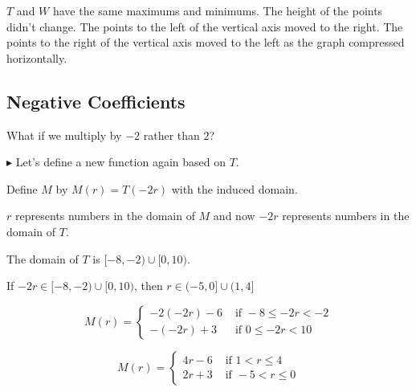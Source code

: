 \documentclass{ximera}
\begin{document}
$T$ and $W$ have the same maximums and minimums.  The height of the points didn't change.  The points to the left of the vertical axis moved to the right. The points to the right of the vertical axis moved to the left as the graph compressed horizontally.




















\subsection*{Negative Coefficients}


What if we multiply by $-2$ rather than $2$?













\textbf{\textcolor{blue!55!black}{$\blacktriangleright$}} Let's define a new function again based on $T$.



Define $M$ by $M(r) = T(-2r)$ with the induced domain.



$r$ represents numbers in the domain of $M$ and now $-2r$ represents numbers in the domain of $T$.  

The domain of $T$ is $[-8,-2) \cup [0,10)$.


If $-2r \in [-8,-2) \cup [0,10)$, then $r \in (-5,0] \cup (1, 4]$








\[
M(r) = 
\begin{cases}
  -2(-2r)-6    & \text{ if }  -8 \leq -2r < -2 \\
  -(-2r)+3   & \text{ if } 0 \leq -2r < 10
\end{cases}
\]





\[
M(r) = 
\begin{cases}
  4r-6    & \text{ if }  1 < r \leq 4 \\
  2r + 3   & \text{ if } -5 < r \leq 0
\end{cases}
\]
\end{document}
